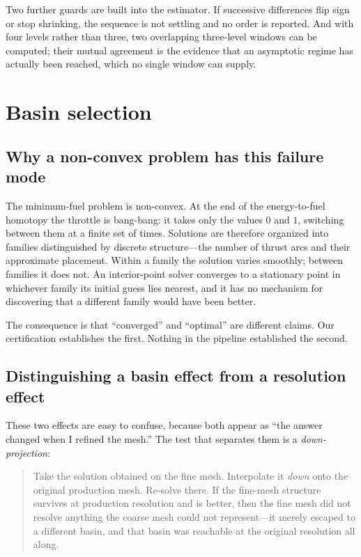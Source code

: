\documentclass[11pt]{article}
\begin{document}
Two further guards are built into the estimator. If successive differences flip
sign or stop shrinking, the sequence is not settling and no order is reported.
And with four levels rather than three, two overlapping three-level windows can
be computed; their mutual agreement is the evidence that an asymptotic regime
has actually been reached, which no single window can supply.

\section{Basin selection}
\label{sec:basin}

\subsection{Why a non-convex problem has this failure mode}

The minimum-fuel problem is non-convex. At the end of the
energy-to-fuel homotopy the throttle is bang-bang: it takes only the values $0$
and $1$, switching between them at a finite set of times. Solutions are
therefore organized into families distinguished by discrete structure---the
number of thrust arcs and their approximate placement. Within a family the
solution varies smoothly; between families it does not. An interior-point
solver converges to a stationary point in whichever family its initial guess
lies nearest, and it has no mechanism for discovering that a different family
would have been better.

The consequence is that ``converged'' and ``optimal'' are different claims.
Our certification establishes the first. Nothing in the pipeline established
the second.

\subsection{Distinguishing a basin effect from a resolution effect}

These two effects are easy to confuse, because both appear as ``the answer
changed when I refined the mesh.'' The test that separates them is a
\emph{down-projection}:

\begin{quote}
Take the solution obtained on the fine mesh. Interpolate it \emph{down} onto
the original production mesh. Re-solve there. If the fine-mesh structure
survives at production resolution and is better, then the fine mesh did not
resolve anything the coarse mesh could not represent---it merely escaped to a
different basin, and that basin was reachable at the original resolution all
along.
\end{quote}
\end{document}
